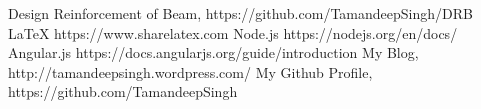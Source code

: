 \begin{thebibliography}{9}
\bibitem{} Design Reinforcement of Beam, https://github.com/TamandeepSingh/DRB
\bibitem{} \LaTeX{} https://www.sharelatex.com
\bibitem{} Node.js https://nodejs.org/en/docs/
\bibitem{} Angular.js https://docs.angularjs.org/guide/introduction
\bibitem{} My Blog, http://tamandeepsingh.wordpress.com/
\bibitem{} My Github Profile, https://github.com/TamandeepSingh
\end{thebibliography}

